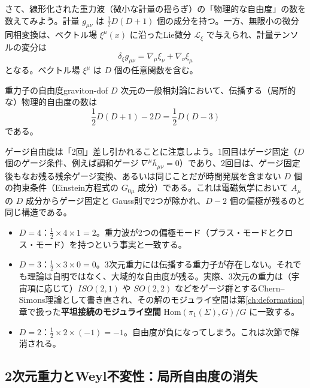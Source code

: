 \documentclass[uplatex, dvipdfmx, book]{jsbook}
\let\origsubsection\subsection
\let\origsubsubsection\subsubsection
\renewcommand{\section}{\origsubsection}
\renewcommand{\subsection}{\origsubsubsection}
\renewcommand{\subsubsection}{\paragraph}
\begin{document}
さて、線形化された重力波（微小な計量の揺らぎ）の「物理的な自由度」の数を数えてみよう。計量 $g_{\mu\nu}$ は $\frac{1}{2}D(D+1)$ 個の成分を持つ。一方、無限小の微分同相変換は、ベクトル場 $\xi^\mu(x)$ に沿ったLie微分 $\mathcal{L}_\xi$ で与えられ、計量テンソルの変分は
\begin{equation}
    \delta_\xi g_{\mu\nu} = \nabla_\mu \xi_\nu + \nabla_\nu \xi_\mu
\end{equation}
となる。ベクトル場 $\xi^\mu$ は $D$ 個の任意関数を含む。

\begin{myprop}{重力子の自由度}{graviton-dof}
$D$ 次元の一般相対論において、伝播する（局所的な）物理的自由度の数は
\begin{equation*}
    \frac{1}{2}D(D+1) - 2D = \frac{1}{2}D(D-3)
\end{equation*}
である。
\end{myprop}

ゲージ自由度は「2回」差し引かれることに注意しよう。1回目はゲージ固定（$D$ 個のゲージ条件、例えば調和ゲージ $\nabla^\mu \bar{h}_{\mu\nu} = 0$）であり、2回目は、ゲージ固定後もなお残る残余ゲージ変換、あるいは同じことだが時間発展を含まない $D$ 個の拘束条件（Einstein方程式の $G_{0\mu}$ 成分）である。これは電磁気学において $A_\mu$ の $D$ 成分からゲージ固定と Gauss則で2つが除かれ、$D - 2$ 個の偏極が残るのと同じ構造である。

\begin{itemize}
    \item $D = 4$：$\frac{1}{2} \times 4 \times 1 = 2$。重力波が2つの偏極モード（プラス・モードとクロス・モード）を持つという事実と一致する。
    \item $D = 3$：$\frac{1}{2} \times 3 \times 0 = 0$。3次元重力には伝播する重力子が存在しない。それでも理論は自明ではなく、大域的な自由度が残る。実際、3次元の重力は（宇宙項に応じて）$ISO(2,1)$ や $SO(2,2)$ などをゲージ群とするChern--Simons理論として書き直され、その解のモジュライ空間は第\ref{ch:deformation}章で扱った\textbf{平坦接続のモジュライ空間} $\mathrm{Hom}(\pi_1(\Sigma), G)/G$ に一致する\cite{witten1988}。
    \item $D = 2$：$\frac{1}{2} \times 2 \times (-1) = -1$。自由度が負になってしまう。これは次節で解消される。
\end{itemize}

\section{2次元重力とWeyl不変性：局所自由度の消失}
\end{document}
